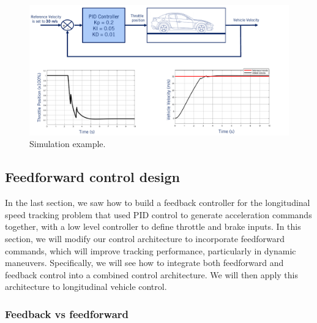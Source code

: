 \begin{figure}[!htb]
\begin{center}
\includegraphics[scale=0.380]{img/longitudinal_control/simulation_example.jpeg}
\end{center}
\caption{Simulation example.}
\label{simulation_example}
\end{figure}


\subsection{Feedforward control design}

In the last section, we saw how to build
a feedback controller for the longitudinal speed tracking problem that used PID
control to generate acceleration commands together, with a low level controller
to define throttle and brake inputs. In this section, we will modify our control architecture
to incorporate feedforward commands, which will improve tracking performance,
particularly in dynamic maneuvers. Specifically, we will see how to
integrate both feedforward and feedback control into a combined
control architecture. We will then apply this architecture
to longitudinal vehicle control. 

\subsubsection{Feedback vs feedforward}


